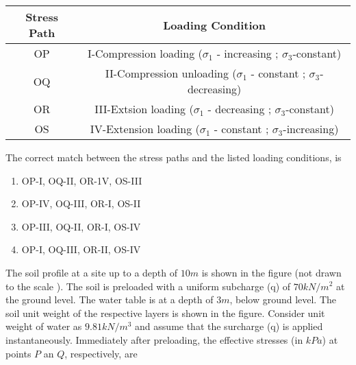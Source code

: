 \begin{table}[ht]
    \centering
 
    \begin{tabular}{c|c} 
        Stress Path & Loading Condition \\
        \hline
        OP & I-Compression loading ($\sigma_{1}$ - increasing ; $\sigma_{3}$-constant) \\ 
       OQ & II-Compression unloading ($\sigma_{1}$ - constant ; $\sigma_{3}$-decreasing) \\ 
       OR & III-Extsion loading ($\sigma_{1}$ - decreasing ; $\sigma_{3}$-constant) \\ 
       OS & IV-Extension loading ($\sigma_{1}$ - constant ; $\sigma_{3}$-increasing) \\ 
       
        \hline 
    \end{tabular}
\end{table}





The correct match between the stress paths and the listed loading conditions, is 
\begin{enumerate}

\item OP-I, OQ-II, OR-1V, OS-III
\item OP-IV, OQ-III, OR-I, OS-II
\item OP-III, OQ-II, OR-I, OS-IV
\item OP-I, OQ-III, OR-II, OS-IV

\end{enumerate}

\item The soil profile at a site up to a depth of $10m $ is shown in the figure (not drawn to the scale ). The soil is preloaded with a uniform subcharge (q) of $70 kN/m^{2}$ at the ground level. The water table is at a depth of $3m $, below ground level. The soil unit weight of the respective layers is shown in the figure. Consider unit weight of water as $9.81 k N/m^{3}$ and assume that the surcharge (q) is applied instantaneously. Immediately after preloading, the effective stresses (in $kPa$) at points $P $ an $Q$, respectively, are

